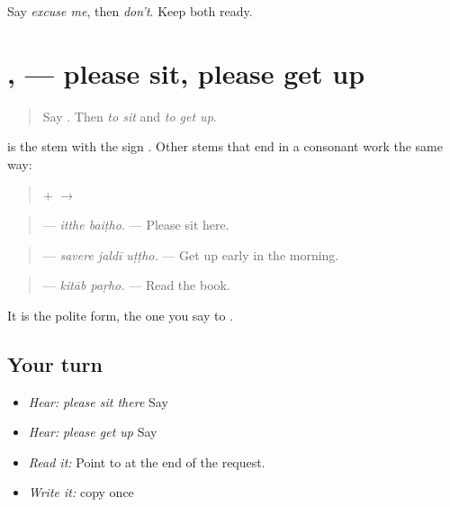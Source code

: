 \begin{tcolorbox}[breakable,colback=teal!4,colframe=teal!35!black,title={Before you move on}]
Say \emph{excuse me}, then \emph{don't}. Keep both ready.
\end{tcolorbox}
\section[\texorpdfstring{\pa{ਬੈਠੋ} · \pa{ਉੱਠੋ} (baiṭho · uṭṭho)}{ਬੈਠੋ · ਉੱਠੋ (baiṭho · uṭṭho)}]{,  — please sit, please get up}

\label{lesson:PA-C213-baitho}



\begin{quote}
Say \textbf{ }. Then \emph{to sit} and \emph{to get up}.
\end{quote}

\begin{grammarlens}[title={Grammar Lens: stem + \pa{ੋ}}]
\textbf{} is the stem \textbf{} with the sign \textbf{}. Other stems that end in a consonant work the same way:

\begin{quote}
\textbf{} + \textbf{} $\to$ \textbf{}
\end{quote}

\begin{quote}
\textbf{ } — \emph{itthe baiṭho.} — Please sit here.
\end{quote}

\begin{quote}
\textbf{  } — \emph{savere jaldī uṭṭho.} — Get up early in the morning.
\end{quote}

\begin{quote}
\textbf{ } — \emph{kitāb paṛho.} — Read the book.
\end{quote}

It is the polite form, the one you say to \textbf{}.
\end{grammarlens}

\subsection*{Your turn}
\begin{itemize}
\raggedright
  \item \emph{Hear:} \emph{please sit there} Say \textbf{ }
  \item \emph{Hear:} \emph{please get up} Say \textbf{}
  \item \emph{Read it:} \textbf{ } Point to \textbf{} at the end of the request.
  \item \emph{Write it:} copy \textbf{} once
\end{itemize}

